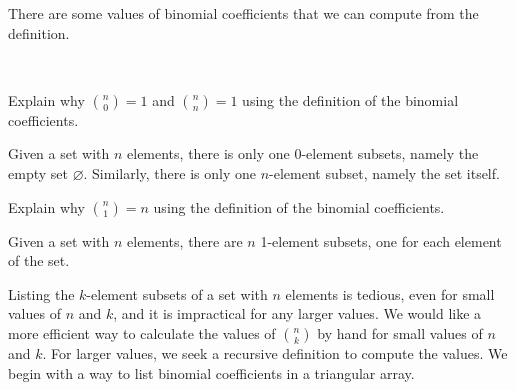 There are some values of binomial coefficients that we can compute from the definition.

\begin{exam}
\label{exam_border_values_binom_coeffs}
~
    \begin{apart}
        \item Explain why $\binom{n}{0}=1$ and $\binom{n}{n}=1$ using the definition of the binomial coefficients.
            \begin{soln}
                Given a set with $n$ elements, there is only one 0-element subsets, namely the empty set $\varnothing$.  Similarly, there is only one $n$-element subset, namely the set itself.
            \end{soln}
        \item Explain why $\binom{n}{1}=n$ using the definition of the binomial coefficients.
            \begin{soln}
                Given a set with $n$ elements, there are $n$ 1-element subsets, one for each element of the set.
            \end{soln}
    \end{apart}
\end{exam}

Listing the $k$-element subsets of a set with $n$ elements is tedious, even for small values of $n$ and $k$, and it is impractical for any larger values.  We would like a more efficient way to calculate the values of $\binom{n}{k}$ by hand for small values of $n$ and $k$.  For larger values, we seek a recursive definition to compute the values.  We begin with a way to list binomial coefficients in a triangular array.

